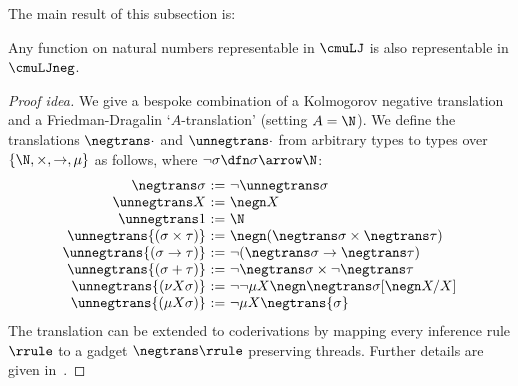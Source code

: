The main result of this subsection is:
\begin{proposition}\label{prop:cmulj-into-cmuljminus}
    Any function on natural numbers representable in $\cmuLJ$ is also representable in $\cmuLJneg$.
\end{proposition}
\begin{proof}
[Proof idea]
We give a bespoke combination of a Kolmogorov negative translation and a Friedman-Dragalin `$A$-translation' (setting $A= \N$). We define the translations $\negtrans \cdot$ and $\unnegtrans \cdot$ from arbitrary types to types over $\{\N,\times, \to , \mu\}$ as follows, where $\lnot \sigma \dfn \sigma \arrow \N$:
\[
\begin{array}{r@{\ := \ }l}
\negtrans \sigma & \neg \unnegtrans \sigma\\ 
\unnegtrans X & \negn X \\
    \unnegtrans 1 & \N \\
    \unnegtrans{(\sigma \times \tau)} & \negn (\negtrans \sigma \times \negtrans \tau) \\
    \unnegtrans{(\sigma \to \tau)} & \neg( \negtrans\sigma \to \negtrans \tau) \\
    \unnegtrans{(\sigma+\tau)} & \neg   \negtrans \sigma \times \neg \negtrans \tau \\
    \unnegtrans{(\nu X \sigma)} & \neg \neg \mu X \negn \negtrans\sigma[\negn X / X] \\
    \unnegtrans{(\mu X \sigma)} &  \neg \mu X \negtrans{\sigma}
\end{array}
\]
The translation can be extended to coderivations by mapping every inference rule $\rrule$ to a gadget $\negtrans \rrule$  preserving threads.
Further details are given in~.
\end{proof}





